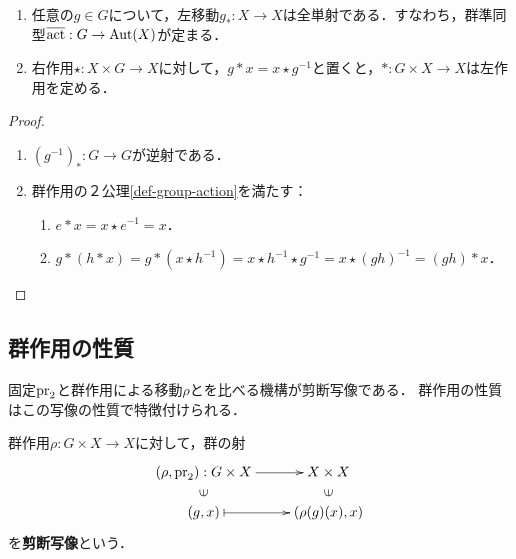 \documentclass[uplatex,dvipdfmx]{jsreport}
\begin{document}
\begin{lemma}[右作用を左作用に変換する反変対応]\label{lemma-group-action}\mbox{}
    \begin{enumerate}
        \item 任意の$g\in G$について，左移動$g_*:X\to X$は全単射である．すなわち，群準同型$\overline{\mathrm{act}}:G\to\mathrm{Aut}(X)$が定まる．
        \item 右作用$\star:X\times G\to X$に対して，$g*x=x\star g^{-1}$と置くと，$*:G\times X\to X$は左作用を定める．
    \end{enumerate}
\end{lemma}
\begin{proof}\mbox{}
    \begin{enumerate}
        \item $(g^{-1})_*:G\to G$が逆射である．
        \item 群作用の２公理\ref{def-group-action}を満たす：
        \begin{enumerate}
            \item $e*x=x\star e^{-1}=x$．
            \item $g*(h*x)=g*(x\star h^{-1})=x\star h^{-1}\star g^{-1}=x\star(gh)^{-1}=(gh)*x$．
        \end{enumerate}
    \end{enumerate}
\end{proof}

\subsection{群作用の性質}

\begin{tcolorbox}[colframe=ForestGreen, colback=ForestGreen!10!white,breakable,colbacktitle=ForestGreen!40!white,coltitle=black,fonttitle=\bfseries\sffamily,
title=群の乗法は正則な自己作用として特徴付けられる]
    固定$\mathrm{pr}_2$と群作用による移動$\rho$とを比べる機構が剪断写像である．
    群作用の性質はこの写像の性質で特徴付けられる．
\end{tcolorbox}

\begin{definition}
    群作用$\rho:G\times X\to X$に対して，群の射
    \[\xymatrix@R-2pc{
            (\rho,\pr_2):G\times X\ar[r]&X\times X\\
            \rotatebox[origin=c]{90}{$\in$}&\rotatebox[origin=c]{90}{$\in$}\\
            (g,x)\ar@{|->}[r]&(\rho(g)(x),x)
    }\]
    を\textbf{剪断写像}という．
\end{definition}
\end{document}
